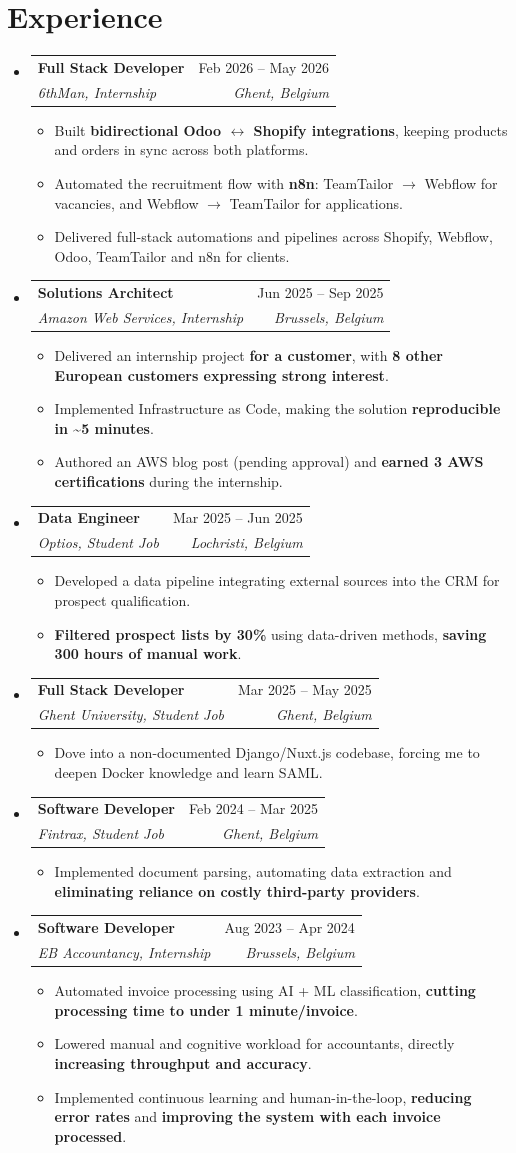 \documentclass[letterpaper,11pt]{article}
\makeatletter
\newcommand{\resumeItem}[1]{
  \item\small{
    {#1 \vspace{-2pt}}
  }
}
\newcommand{\resumeSubheading}[4]{
  \vspace{-2pt}\item
    \begin{tabular*}{0.97\textwidth}[t]{l@{\extracolsep{\fill}}r}
      \textbf{#1} & #2 \\
      \textit{\small#3} & \textit{\small #4} \\
    \end{tabular*}\vspace{-7pt}
}
\newcommand{\resumeSubHeadingListStart}{\begin{itemize}[leftmargin=0.15in, label={}]}
\newcommand{\resumeSubHeadingListEnd}{\end{itemize}}
\newcommand{\resumeItemListStart}{\begin{itemize}}
\newcommand{\resumeItemListEnd}{\end{itemize}\vspace{-5pt}}
\makeatother
\begin{document}
\section{Experience}
  \resumeSubHeadingListStart
  \resumeSubheading
      {Full Stack Developer}{Feb 2026 -- May 2026}
      {6thMan, Internship}{Ghent, Belgium}
      \resumeItemListStart
        \resumeItem{Built \textbf{bidirectional Odoo $\leftrightarrow$ Shopify integrations}, keeping products and orders in sync across both platforms.}
        \resumeItem{Automated the recruitment flow with \textbf{n8n}: TeamTailor $\rightarrow$ Webflow for vacancies, and Webflow $\rightarrow$ TeamTailor for applications.}
        \resumeItem{Delivered full-stack automations and pipelines across Shopify, Webflow, Odoo, TeamTailor and n8n for clients.}
      \resumeItemListEnd
\resumeSubheading
      {Solutions Architect}{Jun 2025 -- Sep 2025}
      {Amazon Web Services, Internship}{Brussels, Belgium}
      \resumeItemListStart
        \resumeItem{Delivered an internship project \textbf{for a customer}, with \textbf{8 other European customers expressing strong interest}.}
        \resumeItem{Implemented Infrastructure as Code, making the solution \textbf{reproducible in \textasciitilde{}5 minutes}.}
        \resumeItem{Authored an AWS blog post (pending approval) and \textbf{earned 3 AWS certifications} during the internship.}
      \resumeItemListEnd
\resumeSubheading
      {Data Engineer}{Mar 2025 -- Jun 2025}
      {Optios, Student Job}{Lochristi, Belgium}
      \resumeItemListStart
        \resumeItem{Developed a data pipeline integrating external sources into the CRM for prospect qualification.}
        \resumeItem{\textbf{Filtered prospect lists by 30\%} using data-driven methods, \textbf{saving 300 hours of manual work}.}
      \resumeItemListEnd
\resumeSubheading
      {Full Stack Developer}{Mar 2025 -- May 2025}
      {Ghent University, Student Job}{Ghent, Belgium}
      \resumeItemListStart
        \resumeItem{Dove into a non-documented Django/Nuxt.js codebase, forcing me to deepen Docker knowledge and learn SAML.}
      \resumeItemListEnd
\resumeSubheading
      {Software Developer}{Feb 2024 -- Mar 2025}
      {Fintrax, Student Job}{Ghent, Belgium}
      \resumeItemListStart
        \resumeItem{Implemented document parsing, automating data extraction and \textbf{eliminating reliance on costly third-party providers}.}
      \resumeItemListEnd
\resumeSubheading
      {Software Developer}{Aug 2023 -- Apr 2024}
      {EB Accountancy, Internship}{Brussels, Belgium}
      \resumeItemListStart
        \resumeItem{Automated invoice processing using AI + ML classification, \textbf{cutting processing time to under 1 minute/invoice}.}
        \resumeItem{Lowered manual and cognitive workload for accountants, directly \textbf{increasing throughput and accuracy}.}
        \resumeItem{Implemented continuous learning and human-in-the-loop, \textbf{reducing error rates} and \textbf{improving the system with each invoice processed}.}
      \resumeItemListEnd
  \resumeSubHeadingListEnd
\end{document}
